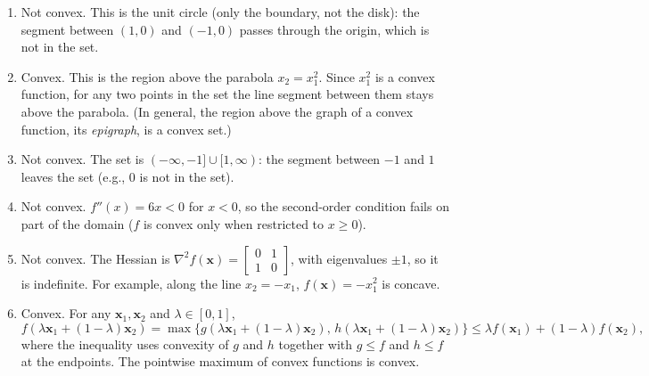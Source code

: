 \begin{solution}
    
    \begin{enumerate}[label=(\alph*)]
        \item Not convex. This is the unit circle (only the boundary, not the disk): the segment between $(1,0)$ and $(-1,0)$ passes through the origin, which is not in the set.
        \item Convex. This is the region above the parabola $x_2 = x_1^2$. Since $x_1^2$ is a convex function, for any two points in the set the line segment between them stays above the parabola. (In general, the region above the graph of a convex function, its \emph{epigraph}, is a convex set.)
        \item Not convex. The set is $(-\infty, -1] \cup [1, \infty)$: the segment between $-1$ and $1$ leaves the set (e.g., $0$ is not in the set).
        \item Not convex. $f''(x) = 6x < 0$ for $x < 0$, so the second-order condition fails on part of the domain ($f$ is convex only when restricted to $x \ge 0$).
        \item Not convex. The Hessian is $\nabla^2 f(\mathbf{x}) = \begin{bmatrix} 0 & 1 \\ 1 & 0 \end{bmatrix}$, with eigenvalues $\pm 1$, so it is indefinite. For example, along the line $x_2 = -x_1$, $f(\mathbf{x}) = -x_1^2$ is concave.
        \item Convex. For any $\mathbf{x}_1, \mathbf{x}_2$ and $\lambda \in [0,1]$,
        \[
            f(\lambda \mathbf{x}_1 + (1-\lambda)\mathbf{x}_2) = \max\{g(\lambda \mathbf{x}_1 + (1-\lambda)\mathbf{x}_2),\, h(\lambda \mathbf{x}_1 + (1-\lambda)\mathbf{x}_2)\} \le \lambda f(\mathbf{x}_1) + (1-\lambda) f(\mathbf{x}_2),
        \]
        where the inequality uses convexity of $g$ and $h$ together with $g \le f$ and $h \le f$ at the endpoints. The pointwise maximum of convex functions is convex.
    \end{enumerate}
    
\end{solution}



